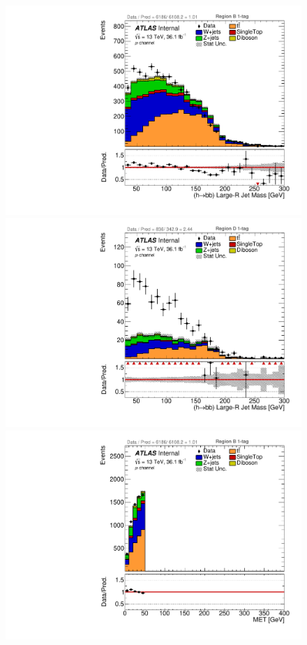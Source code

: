 \begin{figure}[!htbp]
\begin{center}
\includegraphics[scale=0.33]{./figures/boosted/ABCD_1tag0bjet/muon_Inc_RegionB_HbbMass}
\includegraphics[scale=0.33]{./figures/boosted/ABCD_1tag0bjet/muon_Inc_RegionD_HbbMass}\\
\includegraphics[scale=0.33]{./figures/boosted/ABCD_1tag0bjet/muon_Inc_RegionB_MET}    

\end{center}
\end{figure}
